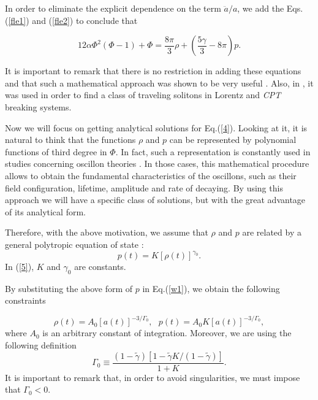 In order to eliminate the explicit dependence on the term $\ddot{a}/a$, we
add the Eqs.(\ref{fle1}) and (\ref{fle2}) to conclude that

\begin{equation}
12\alpha\Phi^{2}(\Phi-1)+\Phi=\frac{8\pi}{3}\rho+\left( \frac {5\gamma}{3}%
-8\pi\right) p.  \label{4}
\end{equation}

It is important to remark that there is no restriction in adding these
equations and that such a mathematical approach was shown to be very useful 
\cite{6}. Also, in \cite{2.3}, it was used in order to find a class of
traveling solitons in Lorentz and \textit{CPT} breaking systems.

Now we will focus on getting analytical solutions for Eq.(\ref{4}). Looking
at it, it is natural to think that the functions $\rho $ and $p$ can be
represented by polynomial functions of third degree in $\Phi $. In fact,
such a representation is constantly used in studies concerning oscillon
theories \cite{7,7.1,7.2,7.3,7.4,m1.1}. In those cases, this mathematical
procedure allows to obtain the fundamental characteristics of the oscillons,
such as their field configuration, lifetime, amplitude and rate of decaying.
By using this approach we will have a specific class of solutions, but with
the great advantage of its analytical form.

Therefore, with the above motivation, we assume that $\rho $ and $p$ are
related by a general polytropic equation of state \cite{m1}:
\begin{equation}
p(t)=K\left[ \rho (t)\right] ^{\gamma _{0}}.  \label{5}
\end{equation}%
In (\ref{5}), $K$ and $\gamma _{0}$ are constants.

By substituting the above form of $p$ in Eq.(\ref{w1}), we obtain the
following constraints

\begin{equation}
\rho (t)=A_{0}[a(t)]^{-3/\Gamma _{0}},\text{ }p(t)=A_{0}K[a(t)]^{-3/\Gamma
_{0}},  \label{7}
\end{equation}%
where $A_{0}$ is an arbitrary constant of integration. Moreover, we are
using the following definition%
\begin{equation}
\Gamma _{0}\equiv \frac{(1-\tilde{\gamma})\left[ 1-\tilde{\gamma}K/\left( 1-%
\tilde{\gamma}\right) \right] }{1+K}.
\end{equation}
It is important to remark that, in order to avoid
singularities, we must impose that $\Gamma _{0}<0$.

